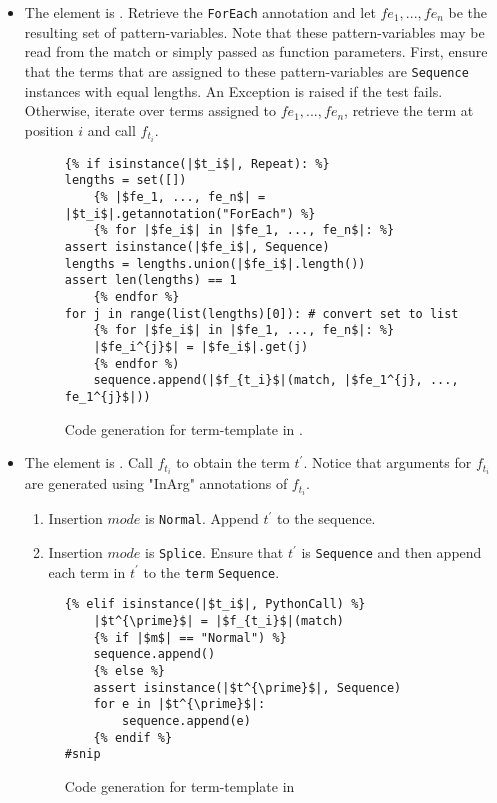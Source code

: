 \begin{itemize}
\item
The element is \TermRepeat. Retrieve the \texttt{ForEach} annotation and let $fe_1, ..., fe_n$ be the resulting set of pattern-variables. Note that these pattern-variables may be read from the match or simply passed as function parameters. First, ensure that the terms that are assigned to these pattern-variables are \texttt{Sequence} instances with equal lengths. An Exception is raised if the test fails. Otherwise, iterate over terms assigned to $fe_1, ..., fe_n$, retrieve the term at position $i$ and call $f_{t_i}$.

\begin{figure}
\begin{verbatim}
{% if isinstance(|$t_i$|, Repeat): %}
lengths = set([])
	{% |$fe_1, ..., fe_n$| = |$t_i$|.getannotation("ForEach") %}
	{% for |$fe_i$| in |$fe_1, ..., fe_n$|: %}
assert isinstance(|$fe_i$|, Sequence)
lengths = lengths.union(|$fe_i$|.length())
assert len(lengths) == 1
	{% endfor %}
for j in range(list(lengths)[0]): # convert set to list
	{% for |$fe_i$| in |$fe_1, ..., fe_n$|: %}
	|$fe_i^{j}$| = |$fe_i$|.get(j)
	{% endfor %)
	sequence.append(|$f_{t_i}$|(match, |$fe_1^{j}, ..., fe_1^{j}$|))
\end{verbatim}
\caption{Code generation for term-template \RepeatNoArg \space in \TermSequenceNoArg.}
\label{codegen-term-sequence-repeat}
\end{figure}

\item
The element is \PythonCall. Call $f_{t_i}$ to obtain the term $t^{\prime}$. Notice that arguments for $f_{t_i}$ are generated using "InArg" annotations of $f_{t_i}$.
	\begin{enumerate}
	\item Insertion $mode$ is \texttt{Normal}. Append $t^{\prime}$ to the sequence.
	\item Insertion $mode$ is \texttt{Splice}. Ensure that $t^{\prime}$ is \texttt{Sequence} and then append each term in $t^{\prime}$ to the \texttt{term} \texttt{Sequence}.
	\end{enumerate}

\begin{figure}
\begin{verbatim}
{% elif isinstance(|$t_i$|, PythonCall) %}
	|$t^{\prime}$| = |$f_{t_i}$|(match)
	{% if |$m$| == "Normal") %}
	sequence.append()
	{% else %}
	assert isinstance(|$t^{\prime}$|, Sequence)
	for e in |$t^{\prime}$|:
		sequence.append(e)
	{% endif %}
#snip
\end{verbatim}
\caption{Code generation for term-template \PythonCallNoArg \space in \TermSequenceNoArg}
\label{codegen-term-sequence-pycall}
\end{figure}


\end{itemize}
